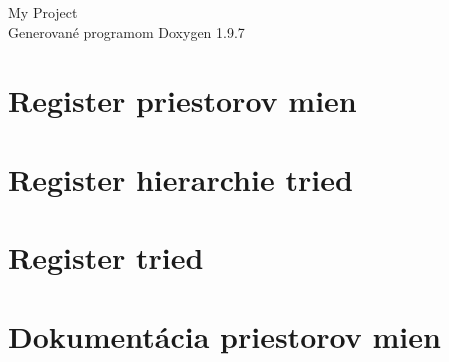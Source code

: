 \documentclass[twoside]{book}
\newcommand{\+}{\discretionary{\mbox{\scriptsize$\hookleftarrow$}}{}{}}
\newcommand{\clearemptydoublepage}{%
    \newpage{\pagestyle{empty}\cleardoublepage}%
  }
\begin{document}
  \raggedbottom
    \hypersetup{pageanchor=false,
                bookmarksnumbered=true,
                pdfencoding=unicode
               }
  \begin{titlepage}
  \vspace*{7cm}
  \begin{center}%
  {\Large My Project}\\
  \vspace*{1cm}
  {\large Generované programom Doxygen 1.9.7}\\
  \end{center}
  \end{titlepage}
  \clearemptydoublepage
  \tableofcontents
  \clearemptydoublepage
  \hypersetup{pageanchor=true}

\chapter{Register priestorov mien}

\chapter{Register hierarchie tried}

\chapter{Register tried}

\chapter{Dokumentácia priestorov mien}



















\end{document}

